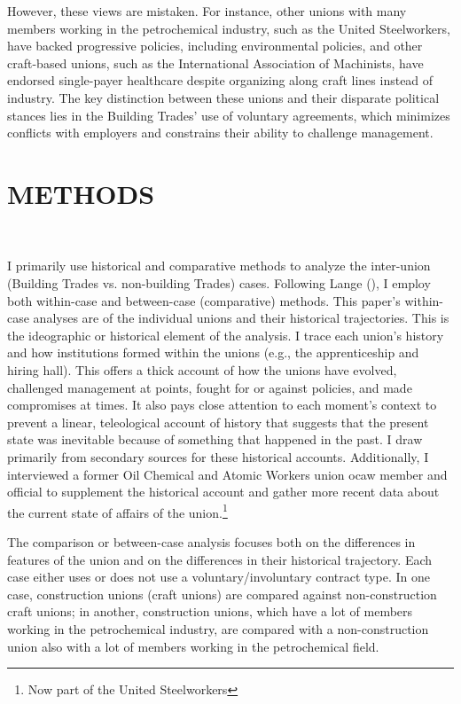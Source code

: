 \documentclass[12pt]{article}
\begin{document}
However, these views are mistaken. For instance, other unions with many members working in the petrochemical industry, such as the United Steelworkers, have backed progressive policies, including environmental policies, and other craft-based unions, such as the International Association of Machinists, have endorsed single-payer healthcare despite organizing along craft lines instead of industry. The key distinction between these unions and their disparate political stances lies in the Building Trades' use of voluntary agreements, which minimizes conflicts with employers and constrains their ability to challenge management.


\section{METHODS} \

I primarily use historical and comparative methods to analyze the inter-union (Building Trades vs. non-building Trades) cases. Following Lange (\citeyear{langeComparativeHistoricalMethods2013}), I employ both within-case and between-case (comparative) methods. This paper's within-case analyses are of the individual unions and their historical trajectories. This is the ideographic or historical element of the analysis. I trace each union's history and how institutions formed within the unions (e.g., the apprenticeship and hiring hall). This offers a thick account of how the unions have evolved, challenged management at points, fought for or against policies, and made compromises at times. It also pays close attention to each moment's context to prevent a linear, teleological account of history that suggests that the present state was inevitable because of something that happened in the past. I draw primarily from secondary sources for these historical accounts. Additionally, I interviewed a former Oil Chemical and Atomic Workers union \acrshort{ocaw} member and official to supplement the historical account and gather more recent data about the current state of affairs of the union.\footnote{Now part of the United Steelworkers}

The comparison or between-case analysis focuses both on the differences in features of the union and on the differences in their historical trajectory. Each case either uses or does not use a voluntary/involuntary contract type. In one case, construction unions (craft unions) are compared against non-construction craft unions; in another, construction unions, which have a lot of members working in the petrochemical industry, are compared with a non-construction union also with a lot of members working in the petrochemical field. 
\end{document}
